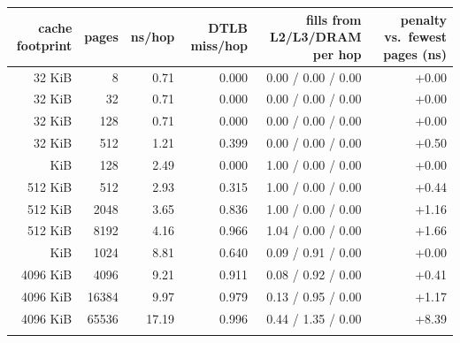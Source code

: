 \begin{tabular}{rrrrrr}
\toprule
cache footprint & pages & ns/hop & DTLB miss/hop & fills from L2/L3/DRAM per hop & penalty vs.\ fewest pages (ns) \\
\midrule
32 KiB & 8 & 0.71 & 0.000 & 0.00 / 0.00 / 0.00 & +0.00 \\
32 KiB & 32 & 0.71 & 0.000 & 0.00 / 0.00 / 0.00 & +0.00 \\
32 KiB & 128 & 0.71 & 0.000 & 0.00 / 0.00 / 0.00 & +0.00 \\
32 KiB & 512 & 1.21 & 0.399 & 0.00 / 0.00 / 0.00 & +0.50 \\
\addlinespace
512 KiB & 128 & 2.49 & 0.000 & 1.00 / 0.00 / 0.00 & +0.00 \\
512 KiB & 512 & 2.93 & 0.315 & 1.00 / 0.00 / 0.00 & +0.44 \\
512 KiB & 2048 & 3.65 & 0.836 & 1.00 / 0.00 / 0.00 & +1.16 \\
512 KiB & 8192 & 4.16 & 0.966 & 1.04 / 0.00 / 0.00 & +1.66 \\
\addlinespace
4096 KiB & 1024 & 8.81 & 0.640 & 0.09 / 0.91 / 0.00 & +0.00 \\
4096 KiB & 4096 & 9.21 & 0.911 & 0.08 / 0.92 / 0.00 & +0.41 \\
4096 KiB & 16384 & 9.97 & 0.979 & 0.13 / 0.95 / 0.00 & +1.17 \\
4096 KiB & 65536 & 17.19 & 0.996 & 0.44 / 1.35 / 0.00 & +8.39 \\
\addlinespace
\bottomrule
\end{tabular}
